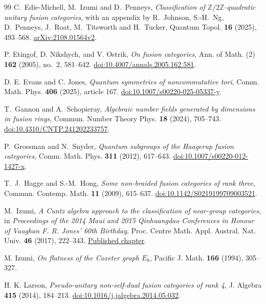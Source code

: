 \documentclass[11pt,a4paper]{article}
\theoremstyle{definition}\newtheorem{definition}[theorem]{Definition}
\theoremstyle{remark}\newtheorem{remark}[theorem]{Remark}
\newcommand{\ZZ}{\mathbb Z}
\numberwithin{equation}{section}
\begin{document}
\begin{thebibliography}{99}
C.~Edie-Michell, M.~Izumi and D.~Penneys,
\emph{Classification of $\ZZ/2\ZZ$-quadratic unitary fusion categories},
with an appendix by R.~Johnson, S.-H.~Ng, D.~Penneys, J.~Roat,
M.~Titsworth and H.~Tucker,
Quantum Topol. \textbf{16} (2025), 493--568.
\href{https://arxiv.org/abs/2108.01564v2}{arXiv:2108.01564v2}.

P. Etingof, D. Nikshych, and V. Ostrik, \emph{On fusion categories},
Ann. of Math. (2) \textbf{162} (2005), no.~2, 581--642.
\href{https://doi.org/10.4007/annals.2005.162.581}{doi:10.4007/annals.2005.162.581}.

D. E. Evans and C. Jones,
\emph{Quantum symmetries of noncommutative tori},
Comm. Math. Phys. \textbf{406} (2025), article 167.
\href{https://doi.org/10.1007/s00220-025-05337-y}{doi:10.1007/s00220-025-05337-y}.

T.~Gannon and A.~Schopieray,
\emph{Algebraic number fields generated by dimensions in fusion rings},
Commun. Number Theory Phys. \textbf{18} (2024), 705--743.
\href{https://doi.org/10.4310/CNTP.241202233757}{doi:10.4310/CNTP.241202233757}.

P.~Grossman and N.~Snyder,
\emph{Quantum subgroups of the Haagerup fusion categories},
Comm. Math. Phys. \textbf{311} (2012), 617--643.
\href{https://doi.org/10.1007/s00220-012-1427-x}{doi:10.1007/s00220-012-1427-x}.

T.~J.~Hagge and S.-M.~Hong, \emph{Some non-braided
fusion categories of rank three}, Commun. Contemp. Math. \textbf{11}
(2009), 615--637.
\href{https://doi.org/10.1142/S0219199709003521}{doi:10.1142/S0219199709003521}.

M.~Izumi, \emph{A Cuntz algebra approach to the classification of near-group categories},
in \emph{Proceedings of the 2014 Maui and 2015 Qinhuangdao Conferences
in Honour of Vaughan F. R. Jones' 60th Birthday},
Proc. Centre Math. Appl. Austral. Nat. Univ. \textbf{46} (2017), 222--343.
\href{https://maths.anu.edu.au/files/8\%2520Izumi_2.pdf}{Published chapter}.

M. Izumi,
\emph{On flatness of the Coxeter graph $E_8$},
Pacific J. Math. \textbf{166} (1994), 305--327.

H. K. Larson, \emph{Pseudo-unitary non-self-dual fusion categories of rank 4},
J. Algebra \textbf{415} (2014), 184--213.
\href{https://doi.org/10.1016/j.jalgebra.2014.05.032}{doi:10.1016/j.jalgebra.2014.05.032}.


\end{thebibliography}
\end{document}
